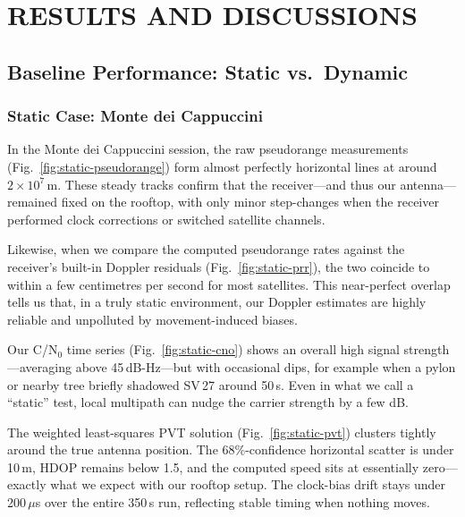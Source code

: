 
\section{RESULTS AND DISCUSSIONS} \label{sec:results}

    \subsection{Baseline Performance: Static vs.\ Dynamic}
    

        \subsubsection{Static Case: Monte dei Cappuccini}
        
        In the Monte dei Cappuccini session, the raw pseudorange measurements (Fig.~\ref{fig:static-pseudorange}) form almost perfectly horizontal lines at around $2\times10^{7}$\,m. These steady tracks confirm that the receiver—and thus our antenna—remained fixed on the rooftop, with only minor step-changes when the receiver performed clock corrections or switched satellite channels.
        
        Likewise, when we compare the computed pseudorange rates against the receiver's built-in Doppler residuals (Fig.~\ref{fig:static-prr}), the two coincide to within a few centimetres per second for most satellites. This near-perfect overlap tells us that, in a truly static environment, our Doppler estimates are highly reliable and unpolluted by movement-induced biases.
        
        Our C/N$_0$ time series (Fig.~\ref{fig:static-cno}) shows an overall high signal strength—averaging above 45\,dB-Hz—but with occasional dips, for example when a pylon or nearby tree briefly shadowed SV\,27 around 50\,s. Even in what we call a “static” test, local multipath can nudge the carrier strength by a few dB.
        
        The weighted least-squares PVT solution (Fig.~\ref{fig:static-pvt}) clusters tightly around the true antenna position. The 68\%-confidence horizontal scatter is under 10\,m, HDOP remains below 1.5, and the computed speed sits at essentially zero—exactly what we expect with our rooftop setup. The clock-bias drift stays under 200\,$\mu$s over the entire 350\,s run, reflecting stable timing when nothing moves.
        
